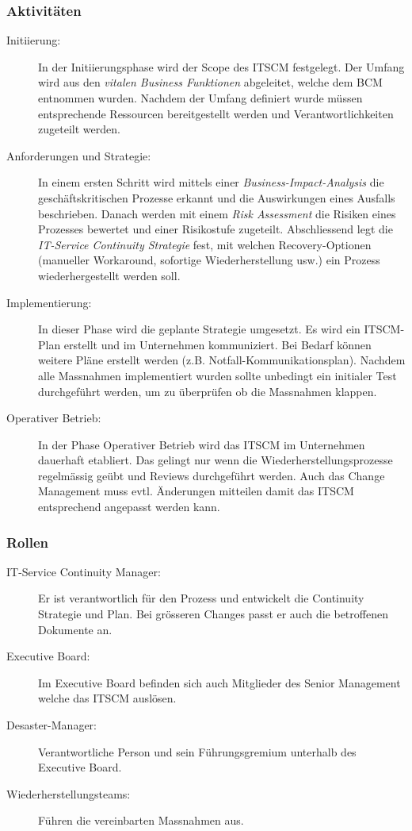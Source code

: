 \subsubsection{Aktivitäten}

\begin{description}
	\item[Initiierung:] In der Initiierungsphase wird der Scope des ITSCM festgelegt. Der Umfang wird aus den \emph{vitalen Business Funktionen} abgeleitet, welche dem BCM entnommen wurden. Nachdem der Umfang definiert wurde müssen entsprechende Ressourcen bereitgestellt werden und Verantwortlichkeiten zugeteilt werden.
	\item[Anforderungen und Strategie:] In einem ersten Schritt wird mittels einer \emph{Business-Impact-Analysis} die geschäftskritischen Prozesse erkannt und die Auswirkungen eines Ausfalls beschrieben. Danach werden mit einem \emph{Risk Assessment} die Risiken eines Prozesses bewertet und einer Risikostufe zugeteilt. Abschliessend legt die \emph{IT-Service Continuity Strategie} fest, mit welchen Recovery-Optionen (manueller Workaround, sofortige Wiederherstellung usw.) ein Prozess wiederhergestellt werden soll.
	\item[Implementierung:] In dieser Phase wird die geplante Strategie umgesetzt. Es wird ein ITSCM-Plan erstellt und im Unternehmen kommuniziert. Bei Bedarf können weitere Pläne erstellt werden (z.B. Notfall-Kommunikationsplan). Nachdem alle Massnahmen implementiert wurden sollte unbedingt ein initialer Test durchgeführt werden, um zu überprüfen ob die Massnahmen klappen.
	\item[Operativer Betrieb:] In der Phase Operativer Betrieb wird das ITSCM im Unternehmen dauerhaft etabliert. Das gelingt nur wenn die Wiederherstellungsprozesse regelmässig geübt und Reviews durchgeführt werden. Auch das Change Management muss evtl. Änderungen mitteilen damit das ITSCM entsprechend angepasst werden kann.
\end{description}

\subsubsection{Rollen}

\begin{description}
	\item[IT-Service Continuity Manager:] Er ist verantwortlich für den Prozess und entwickelt die Continuity Strategie und Plan. Bei grösseren Changes passt er auch die betroffenen Dokumente an.
	\item[Executive Board:] Im Executive Board befinden sich auch Mitglieder des Senior Management welche das ITSCM auslösen.
	\item[Desaster-Manager:] Verantwortliche Person und sein Führungsgremium unterhalb des Executive Board.
	\item[Wiederherstellungsteams:] Führen die vereinbarten Massnahmen aus.
\end{description}

